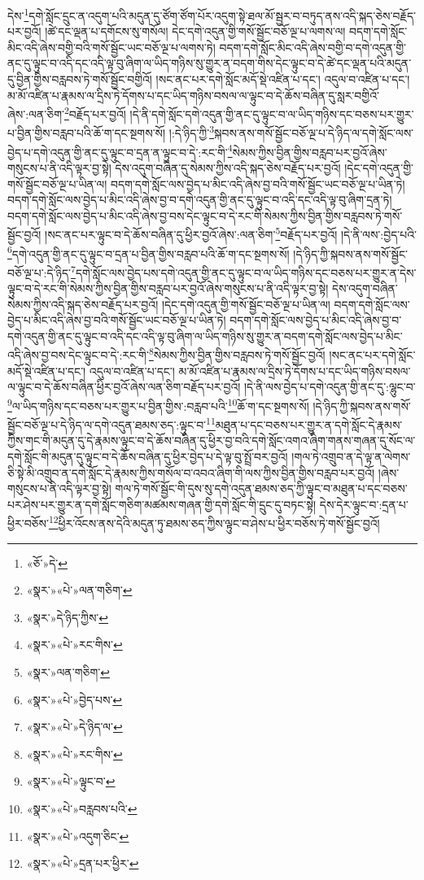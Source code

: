 དེས་\footnote{«ཅོ་»དེ་}དགེ་སློང་དྲུང་ན་འདུག་པའི་མདུན་དུ་ཙོག་ཙོག་པོར་འདུག་སྟེ་ཐལ་མོ་སྦྱར་བ་བཏུད་ནས་འདི་སྐད་ཅེས་བརྗོད་པར་བྱའོ། །ཚེ་དང་ལྡན་པ་དགོངས་སུ་གསོལ། དེང་དགེ་འདུན་གྱི་གསོ་སྦྱོང་བཅོ་ལྔ་པ་ལགས་ལ། བདག་དགེ་སློང་མིང་འདི་ཞེས་བགྱི་བའི་གསོ་སྦྱོང་ཡང་བཅོ་ལྔ་པ་ལགས་ཏེ། བདག་དགེ་སློང་མིང་འདི་ཞེས་བགྱི་བ་དགེ་འདུན་གྱི་ནང་དུ་ལྟུང་བ་འདི་དང་འདི་ལྟ་བུ་ཞིག་ལ་ཡིད་གཉིས་སུ་གྱུར་ན་བདག་གིས་དེང་ལྟུང་བ་དེ་ཚེ་དང་ལྡན་པའི་མདུན་དུ་བྱིན་གྱིས་བརླབས་ཏེ་གསོ་སྦྱོང་བགྱིའོ། །སང་ནང་པར་དགེ་སློང་མདོ་སྡེ་འཛིན་པ་དང་། འདུལ་བ་འཛིན་པ་དང་། མ་མོ་འཛིན་པ་རྣམས་ལ་དྲིས་ཏེ་དོགས་པ་དང་ཡིད་གཉིས་བསལ་ལ་ལྟུང་བ་དེ་ཆོས་བཞིན་དུ་སླར་བགྱིའོ་ཞེས་:ལན་ཅིག་\footnote{«སྣར་»«པེ་»ལན་གཅིག་}བརྗོད་པར་བྱའོ། །དེ་ནི་དགེ་སློང་དགེ་འདུན་གྱི་ནང་དུ་ལྟུང་བ་ལ་ཡིད་གཉིས་དང་བཅས་པར་གྱུར་པ་བྱིན་གྱིས་བརླབ་པའི་ཆོ་ག་དང་སྔགས་སོ། །:དེ་ཉིད་ཀྱི་\footnote{«སྣར་»དེ་ཉིད་ཀྱིས་}སྐབས་ནས་གསོ་སྦྱོང་བཅོ་ལྔ་པ་དེ་ཉིད་ལ་དགེ་སློང་ལས་བྱེད་པ་དགེ་འདུན་གྱི་ནང་དུ་ལྟུང་བ་དྲན་ན་ལྟུང་བ་དེ་:རང་གི་\footnote{«སྣར་»«པེ་»རང་གིས་}སེམས་ཀྱིས་བྱིན་གྱིས་བརླབ་པར་བྱའོ་ཞེས་གསུངས་པ་ནི་འདི་ལྟར་བྱ་སྟེ། དེས་འདུག་བཞིན་དུ་སེམས་ཀྱིས་འདི་སྐད་ཅེས་བརྗོད་པར་བྱའོ། །དེང་དགེ་འདུན་གྱི་གསོ་སྦྱོང་བཅོ་ལྔ་པ་ཡིན་ལ། བདག་དགེ་སློང་ལས་བྱེད་པ་མིང་འདི་ཞེས་བྱ་བའི་གསོ་སྦྱོང་ཡང་བཅོ་ལྔ་པ་ཡིན་ཏེ། བདག་དགེ་སློང་ལས་བྱེད་པ་མིང་འདི་ཞེས་བྱ་བ་དགེ་འདུན་གྱི་ནང་དུ་ལྟུང་བ་འདི་དང་འདི་ལྟ་བུ་ཞིག་དྲན་ཏེ། བདག་དགེ་སློང་ལས་བྱེད་པ་མིང་འདི་ཞེས་བྱ་བས་དེང་ལྟུང་བ་དེ་རང་གི་སེམས་ཀྱིས་བྱིན་གྱིས་བརླབས་ཏེ་གསོ་སྦྱོང་བྱའོ། །སང་ནང་པར་ལྟུང་བ་དེ་ཆོས་བཞིན་དུ་ཕྱིར་བྱའོ་ཞེས་:ལན་ཅིག་\footnote{«སྣར་»ལན་གཅིག་}བརྗོད་པར་བྱའོ། །དེ་ནི་ལས་:བྱེད་པའི་\footnote{«སྣར་»«པེ་»བྱེད་པས་}དགེ་འདུན་གྱི་ནང་དུ་ལྟུང་བ་དྲན་པ་བྱིན་གྱིས་བརླབ་པའི་ཆོ་ག་དང་སྔགས་སོ། །དེ་ཉིད་ཀྱི་སྐབས་ནས་གསོ་སྦྱོང་བཅོ་ལྔ་པ་:དེ་ཉིད་\footnote{«སྣར་»«པེ་»དེ་ཉིད་ལ་}དགེ་སློང་ལས་བྱེད་པས་དགེ་འདུན་གྱི་ནང་དུ་ལྟུང་བ་ལ་ཡིད་གཉིས་དང་བཅས་པར་གྱུར་ན་དེས་ལྟུང་བ་དེ་རང་གི་སེམས་ཀྱིས་བྱིན་གྱིས་བརླབ་པར་བྱའོ་ཞེས་གསུངས་པ་ནི་འདི་ལྟར་བྱ་སྟེ། དེས་འདུག་བཞིན་སེམས་ཀྱིས་འདི་སྐད་ཅེས་བརྗོད་པར་བྱའོ། །དེང་དགེ་འདུན་གྱི་གསོ་སྦྱོང་བཅོ་ལྔ་པ་ཡིན་ལ། བདག་དགེ་སློང་ལས་བྱེད་པ་མིང་འདི་ཞེས་བྱ་བའི་གསོ་སྦྱོང་ཡང་བཅོ་ལྔ་པ་ཡིན་ཏེ། བདག་དགེ་སློང་ལས་བྱེད་པ་མིང་འདི་ཞེས་བྱ་བ་དགེ་འདུན་གྱི་ནང་དུ་ལྟུང་བ་འདི་དང་འདི་ལྟ་བུ་ཞིག་ལ་ཡིད་གཉིས་སུ་གྱུར་ན་བདག་དགེ་སློང་ལས་བྱེད་པ་མིང་འདི་ཞེས་བྱ་བས་དེང་ལྟུང་བ་དེ་:རང་གི་\footnote{«སྣར་»«པེ་»རང་གིས་}སེམས་ཀྱིས་བྱིན་གྱིས་བརླབས་ཏེ་གསོ་སྦྱོང་བྱའོ། །སང་ནང་པར་དགེ་སློང་མདོ་སྡེ་འཛིན་པ་དང་། འདུལ་བ་འཛིན་པ་དང་། མ་མོ་འཛིན་པ་རྣམས་ལ་དྲིས་ཏེ་དོགས་པ་དང་ཡིད་གཉིས་བསལ་ལ་ལྟུང་བ་དེ་ཆོས་བཞིན་ཕྱིར་བྱའོ་ཞེས་ལན་ཅིག་བརྗོད་པར་བྱའོ། །དེ་ནི་ལས་བྱེད་པ་དགེ་འདུན་གྱི་ནང་དུ་:ལྷུང་བ་\footnote{«སྣར་»«པེ་»ལྟུང་བ་}ལ་ཡིད་གཉིས་དང་བཅས་པར་གྱུར་པ་བྱིན་གྱིས་:བརླབ་པའི་\footnote{«སྣར་»«པེ་»བརླབས་པའི་}ཆོ་ག་དང་སྔགས་སོ། །དེ་ཉིད་ཀྱི་སྐབས་ནས་གསོ་སྦྱོང་བཅོ་ལྔ་པ་དེ་ཉིད་ལ་དགེ་འདུན་ཐམས་ཅད་:ལྟུང་བ་\footnote{«སྣར་»«པེ་»འདུག་ཅིང་}མཐུན་པ་དང་བཅས་པར་གྱུར་ན་དགེ་སློང་དེ་རྣམས་ཀྱིས་གང་གི་མདུན་དུ་དེ་རྣམས་ལྟུང་བ་དེ་ཆོས་བཞིན་དུ་ཕྱིར་བྱ་བའི་དགེ་སློང་འགའ་ཞིག་གནས་གཞན་དུ་སོང་ལ་དགེ་སློང་གི་མདུན་དུ་ལྟུང་བ་དེ་ཆོས་བཞིན་དུ་ཕྱིར་བྱེད་པ་དེ་ལྟ་བུ་སྤྲོ་བར་བྱའོ། །གལ་ཏེ་འགྲུབ་ན་དེ་ལྟ་ན་ལེགས་ཅི་སྟེ་མི་འགྲུབ་ན་དགེ་སློང་དེ་རྣམས་ཀྱིས་གསོལ་བ་འབའ་ཞིག་གི་ལས་ཀྱིས་བྱིན་གྱིས་བརླབ་པར་བྱའོ། །ཞེས་གསུངས་པ་ནི་འདི་ལྟར་བྱ་སྟེ། གལ་ཏེ་གསོ་སྦྱོང་གི་དུས་སུ་དགེ་འདུན་ཐམས་ཅད་ཀྱི་ལྟུང་བ་མཐུན་པ་དང་བཅས་པར་ཤེས་པར་གྱུར་ན་དགེ་སློང་གཅིག་མཚམས་གཞན་གྱི་དགེ་སློང་གི་དྲུང་དུ་བཏང་སྟེ། དེས་དེར་ལྟུང་བ་:དྲན་པ་ཕྱིར་བཅོས་\footnote{«སྣར་»«པེ་»དྲན་པར་ཕྱིར་}ཕྱིར་འོངས་ནས་དེའི་མདུན་ཏུ་ཐམས་ཅད་ཀྱིས་ལྟུང་བ་ཤེས་པ་ཕྱིར་བཅོས་ཏེ་གསོ་སྦྱོང་བྱའོ། 